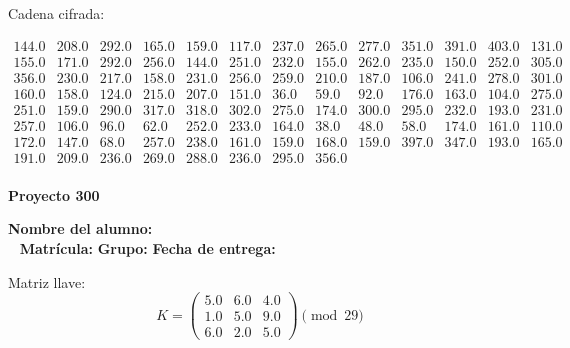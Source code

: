 \documentclass[12pt]{article}
\begin{document}
Cadena cifrada:
\begin{center}
$\begin{array}{lllllllllllll}
144.0 & 208.0 & 292.0 & 165.0 & 159.0 & 117.0 & 237.0 & 265.0 & 277.0 & 351.0 & 391.0 & 403.0 & 131.0\\
155.0 & 171.0 & 292.0 & 256.0 & 144.0 & 251.0 & 232.0 & 155.0 & 262.0 & 235.0 & 150.0 & 252.0 & 305.0\\
356.0 & 230.0 & 217.0 & 158.0 & 231.0 & 256.0 & 259.0 & 210.0 & 187.0 & 106.0 & 241.0 & 278.0 & 301.0\\
160.0 & 158.0 & 124.0 & 215.0 & 207.0 & 151.0 & 36.0 & 59.0 & 92.0 & 176.0 & 163.0 & 104.0 & 275.0\\
251.0 & 159.0 & 290.0 & 317.0 & 318.0 & 302.0 & 275.0 & 174.0 & 300.0 & 295.0 & 232.0 & 193.0 & 231.0\\
257.0 & 106.0 & 96.0 & 62.0 & 252.0 & 233.0 & 164.0 & 38.0 & 48.0 & 58.0 & 174.0 & 161.0 & 110.0\\
172.0 & 147.0 & 68.0 & 257.0 & 238.0 & 161.0 & 159.0 & 168.0 & 159.0 & 397.0 & 347.0 & 193.0 & 165.0\\
191.0 & 209.0 & 236.0 & 269.0 & 288.0 & 236.0 & 295.0 & 356.0\\
\end{array}$
\end{center}

\newpage


\textbf{Proyecto 300}

\textbf{Nombre del alumno:} \underline{\hspace{13cm}}\\\
\vspace{1cm}
\textbf{Matrícula:} \underline{\hspace{4cm}} \hspace{1cm}
\textbf{Grupo:} \underline{\hspace{2cm}}
\textbf{Fecha de entrega:} \underline{\hspace{2cm}}

\medskip

Matriz llave:
\[
K = \begin{pmatrix}
5.0 & 6.0 & 4.0\\
1.0 & 5.0 & 9.0\\
6.0 & 2.0 & 5.0
\end{pmatrix} \pmod{29}
\]
\end{document}
